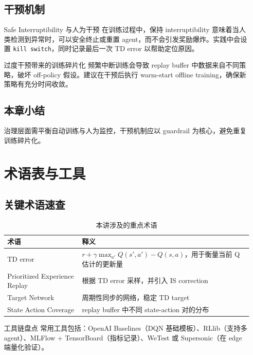 \documentclass[a4paper]{article}
\begin{document}
\subsection{干预机制}

\begin{importantbox}{Safe Interruptibility 与人为干预}
在训练过程中，保持 interruptibility 意味着当人类检测到异常时，可以安全终止或重置 agent，而不会引发奖励爆炸。实践中会设置 \texttt{kill switch}，同时记录最后一次 TD error 以帮助定位原因。
\end{importantbox}

\begin{warningbox}{过度干预带来的训练碎片化}
频繁中断训练会导致 replay buffer 中数据来自不同策略，破坏 off-policy 假设。建议在干预后执行 warm-start offline training，确保新策略有充分时间收敛。
\end{warningbox}

\subsection{本章小结}

治理层面需平衡自动训练与人为监控，干预机制应以 guardrail 为核心，避免重复训练碎片化。

\section{术语表与工具}

\subsection{关键术语速查}

\begin{table}[H]
\centering
\begin{tabular}{lp{10cm}}
\toprule
术语 & 释义 \\
\midrule
TD error & $r + \gamma \max_{a'} Q(s', a') - Q(s, a)$，用于衡量当前 Q 估计的更新量 \\
Prioritized Experience Replay & 根据 TD error 采样，并引入 IS correction \\
Target Network & 周期性同步的网络，稳定 TD target \\
State Action Coverage & replay buffer 中不同 state-action 对的分布 \\
\bottomrule
\end{tabular}
\caption{本讲涉及的重点术语}
\end{table}

\begin{knowledgebox}{工具链盘点}
常用工具包括：OpenAI Baselines（DQN 基础模板）、RLlib（支持多 agent）、MLFlow + TensorBoard（指标记录）、WeTest 或 Supersonic（在 edge 端量化验证）。
\end{knowledgebox}
\end{document}
